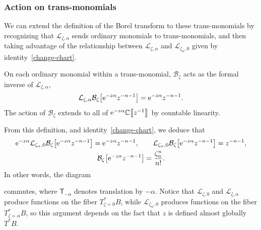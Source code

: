 \documentclass[pdftex]{sigma}
\newcommand{\C}{\mathbb{C}}
\newcommand{\laplace}{\mathcal{L}}
\newcommand{\borel}{\mathcal{B}}
\numberwithin{equation}{section}
\begin{document}
\subsubsection{Action on trans-monomials}\label{sec:action_transseries}
%
We can extend the definition of the Borel transform to these trans-monomials by recognizing that $\laplace_{\zeta, \alpha}$ sends ordinary monomials to trans-monomials, and then taking advantage of the relationship between $\laplace_{\zeta, \alpha}$ and $\laplace_{\zeta_\alpha, 0}$ given by identity~\eqref{change-chart}.
\begin{Definition}
On each ordinary monomial within a trans-monomial, $\borel_\zeta$ acts as the formal inverse of $\laplace_{\zeta,\alpha}$,
\[
\laplace_{\zeta,\alpha}\borel_\zeta\bigl[{\rm e}^{-z\alpha} z^{-n-1} \bigr]={\rm e}^{-z\alpha} z^{-n-1}.
\]
The action of $\borel_\zeta$ extends to all of ${\rm e}^{-z\alpha} \C\big\llbracket z^{-1} \big\rrbracket$ by countable linearity.
\end{Definition}
From this definition, and identity~\eqref{change-chart}, we deduce that
\begin{gather*}
{\rm e}^{-z\alpha}\laplace_{\zeta_\alpha,0}\borel_\zeta\bigl[{\rm e}^{-z\alpha} z^{-n-1}\bigr] = {\rm e}^{-z\alpha} z^{-n-1} ,\qquad
\laplace_{\zeta_\alpha,0}\borel_\zeta\bigl[{\rm e}^{-z\alpha} z^{-n-1}\bigr] = z^{-n-1} ,\\
\borel_{\zeta}\bigl[{\rm e}^{-z\alpha}z^{-n-1}\bigr] = \frac{\zeta_\alpha^n}{n!}.
\end{gather*}
In other words, the diagram
\begin{center}
\end{center}
commutes, where $\mathsf{T}_{-\alpha}$ denotes translation by $-\alpha$. Notice that $\laplace_{\zeta, 0}$ and $\laplace_{\zeta, \alpha}$ produce functions on the fiber $T^*_{\zeta = 0}B$, while $\laplace_{\zeta_\alpha, 0}$ produces functions on the fiber $T^*_{\zeta = \alpha}B$, so this argument depends on the fact that $z$ is defined almost globally $T^*B$.
\end{document}
